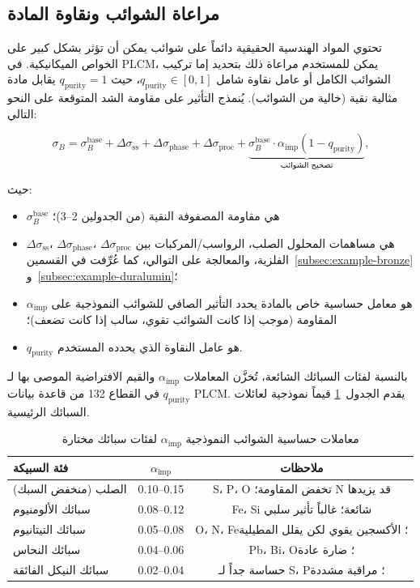 \documentclass[11pt,a4paper]{article}
\begin{document}
\begin{otherlanguage}{arabic}
		\subsection{مراعاة الشوائب ونقاوة المادة}
		\label{subsec:purity}
		
		تحتوي المواد الهندسية الحقيقية دائماً على شوائب يمكن أن تؤثر بشكل كبير على الخواص الميكانيكية. في PLCM، يمكن للمستخدم مراعاة ذلك بتحديد إما تركيب الشوائب الكامل أو عامل نقاوة شامل \(q_{\mathrm{purity}} \in [0,1]\)، حيث \(q_{\mathrm{purity}}=1\) يقابل مادة مثالية نقية (خالية من الشوائب). يُنمذج التأثير على مقاومة الشد المتوقعة على النحو التالي:
		
		\[
		\sigma_B = \sigma_B^{\mathrm{base}} + \Delta\sigma_{\mathrm{ss}} + \Delta\sigma_{\mathrm{phase}} + \Delta\sigma_{\mathrm{proc}} + \underbrace{\sigma_B^{\mathrm{base}} \cdot \alpha_{\mathrm{imp}} (1 - q_{\mathrm{purity}})}_{\text{تصحيح الشوائب}},
		\]
		
		حيث:
		\begin{itemize}
			\item \(\sigma_B^{\mathrm{base}}\) هي مقاومة المصفوفة النقية (من الجدولين 2–3)؛
			\item \(\Delta\sigma_{\mathrm{ss}}\)، \(\Delta\sigma_{\mathrm{phase}}\)، \(\Delta\sigma_{\mathrm{proc}}\) هي مساهمات المحلول الصلب، الرواسب/المركبات بين الفلزية، والمعالجة على التوالي، كما عُرِّفت في القسمين~\ref{subsec:example-bronze} و~\ref{subsec:example-duralumin}؛
			\item \(\alpha_{\mathrm{imp}}\) هو معامل حساسية خاص بالمادة يحدد التأثير الصافي للشوائب النموذجية على المقاومة (موجب إذا كانت الشوائب تقوي، سالب إذا كانت تضعف)؛
			\item \(q_{\mathrm{purity}}\) هو عامل النقاوة الذي يحدده المستخدم.
		\end{itemize}
		
		بالنسبة لفئات السبائك الشائعة، تُخزَّن المعاملات \(\alpha_{\mathrm{imp}}\) والقيم الافتراضية الموصى بها لـ \(q_{\mathrm{purity}}\) في القطاع 132 من قاعدة بيانات PLCM. يقدم الجدول~\ref{tab:impurity-coefficients} قيماً نموذجية لعائلات السبائك الرئيسية.
		
		\begin{table}[htbp]
			\centering
			\caption{معاملات حساسية الشوائب النموذجية \(\alpha_{\mathrm{imp}}\) لفئات سبائك مختارة}
			\label{tab:impurity-coefficients}
			\begin{tabular}{lcc}
				\toprule
				\textbf{فئة السبيكة} & \(\alpha_{\mathrm{imp}}\) & \textbf{ملاحظات} \\
				\midrule
				الصلب (منخفض السبك) & 0.10–0.15 & S، P، O تخفض المقاومة؛ N قد يزيدها \\
				سبائك الألومنيوم & 0.08–0.12 & Fe، Si شائعة؛ غالباً تأثير سلبي \\
				سبائك التيتانيوم & 0.05–0.08 & O، N، Fe؛ الأكسجين يقوي لكن يقلل المطيلية \\
				سبائك النحاس & 0.04–0.06 & Pb، Bi، O؛ ضارة عادة \\
				سبائك النيكل الفائقة & 0.02–0.04 & حساسة جداً لـ S، P؛ مراقبة مشددة \\
				\bottomrule
			\end{tabular}
		\end{table}
		

\end{otherlanguage}
\end{document}

